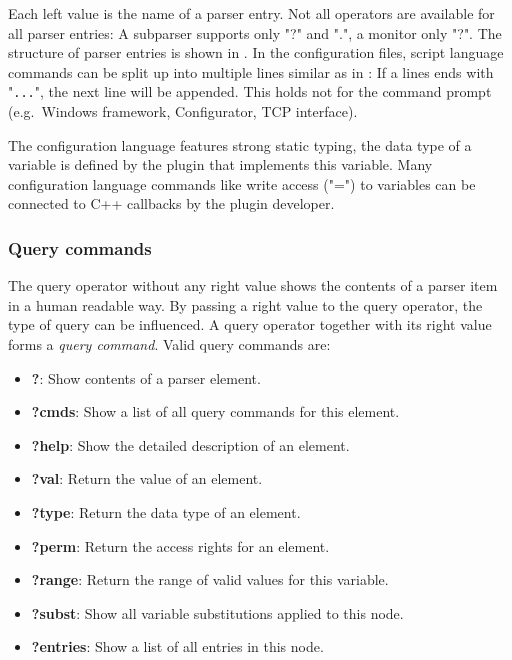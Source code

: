 Each left value is the name of a parser entry. Not all operators are
available for all parser entries: A subparser supports only "?" and
".", a monitor only "?". The structure of parser entries is shown in
. In the configuration files, \mha{} script
language commands can be split up into multiple lines similar as in
\Matlab{}: If a lines ends with "\verb!...!", the next line will be
appended. This holds not for the command prompt (e.g.\ Windows
framework, Configurator, TCP interface).


The \mha{} configuration language features strong static typing, the data type
of a variable is defined by the plugin that implements this variable.
Many configuration language commands like write access ("=") to variables can
be connected to C++ callbacks by the plugin developer.

\subsubsection{Query commands}

%
The query operator without any right value shows the contents of a parser item
in a human readable way. By passing a right value to the query operator, the
type of query can be influenced. A query operator together with its right
value forms a {\em query command}. Valid query commands
are:
%
%
%
%
%
%
%
%

\begin{itemize}
\item {\bf ?}: Show contents of a parser element.
\item {\bf ?cmds}: Show a list of all query commands for this element.
\item {\bf ?help}: Show the detailed description of an element.
\item {\bf ?val}: Return the value of an element.
\item {\bf ?type}: Return the data type of an element.
\item {\bf ?perm}: Return the access rights for an element.
\item {\bf ?range}: Return the range of valid values for this variable.
\item {\bf ?subst}: Show all variable substitutions applied to this node.
\item {\bf ?entries}: Show a list of all entries in this node.
\end{itemize}

